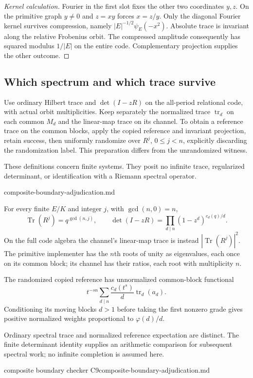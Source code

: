 \begin{proof}[Kernel calculation]
Fourier in the first slot fixes the other two coordinates $y,z$. On the
primitive graph $y\ne0$ and $z=xy$ forces $x=z/y$. Only the diagonal
Fourier kernel survives compression, namely $|E|^{-1/2}\psi_E(-x^2)$.
Absolute trace is invariant along the relative Frobenius orbit. The
compressed amplitude consequently has squared modulus $1/|E|$ on the
entire code. Complementary projection supplies the other outcome.
\end{proof}

\subsection{Which spectrum and which trace survive}

\begin{definition}
Use ordinary Hilbert trace and $\det(I-zR)$ on the all-period relational
code, with actual orbit multiplicities. Keep separately the normalized
trace $\operatorname{tr}_d$ on each common $M_d$ and the linear-map trace
on its channel. To obtain a reference trace on the common blocks, apply
the copied reference and invariant projection, retain success, then
uniformly randomize over $R^j$, $0\leq j<n$, explicitly discarding the
randomization label. This preparation differs from the unrandomized witness.
\end{definition}
\begin{scope}
These definitions concern finite systems. They posit no infinite trace,
regularized determinant, or identification with a Riemann spectral operator.
\end{scope}
{composite-boundary-adjudication.md}

\begin{proposition}
\statusSketch\quad
For every finite $E/K$ and integer $j$, with $\gcd(n,0)=n$,
\[
 \operatorname{Tr}(R^j)=q^{\gcd(n,j)},\qquad
 \det(I-zR)=\prod_{d\mid n}(1-z^d)^{c_d(q)/d}.
\]
On the full code algebra the channel's linear-map trace is instead
$|\operatorname{Tr}(R^j)|^2$. The primitive implementer has the $n$th
roots of unity as eigenvalues, each once on its common block; its channel
has their ratios, each root with multiplicity $n$.

The randomized copied reference has unnormalized common-block functional
\[
 t^{-sn}\sum_{d\mid n}\frac{c_d(t^s)}d\operatorname{tr}_d(a_d).
\]
Conditioning its moving blocks $d>1$ before taking the first nonzero grade
gives positive normalized weights proportional to $\varphi(d)/d$.
\end{proposition}
\begin{scope}
Ordinary spectral trace and normalized reference expectation are distinct.
The finite determinant identity supplies an arithmetic comparison for
subsequent spectral work; no infinite completion is assumed here.
\end{scope}
{composite boundary checker C9}{composite-boundary-adjudication.md}

